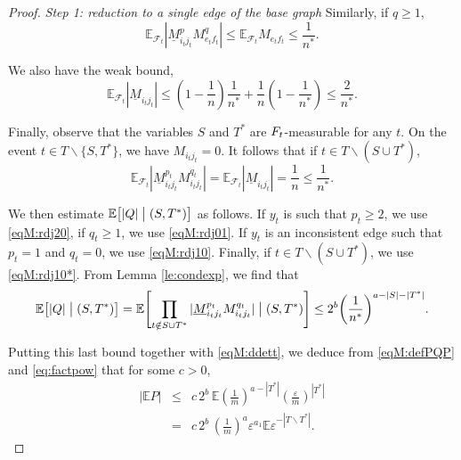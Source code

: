 \documentclass[11pt]{article}
\newcommand{\dE}{\mathbb {E}}
\newcommand{\cF}{\mathcal {F}}
\newcommand{\ABS}[1]{{{\left| #1 \right|}}} %
\newcommand{\SBRA}[1]{{{\left[#1\right]}}} %
\newcommand{\PAR}[1]{{{\left(#1\right)}}} %
\newcommand{\1}{1\!\!{\sf I}}\newcommand{\IND}{\1}
\newcommand{\veps}{\varepsilon}
\begin{document}
\begin{proof}  {\em Step 1: reduction to a single edge of the base graph}
Similarly, if $q \geq 1$, 
\begin{equation} \label{eqM:rdj01}
\dE_{\cF_t}  | \underline M_{i_t j_t}^p M_{e_t f_t}^q |  \leq \dE_{\cF_t}   M_{e_t f_t}    \leq \frac{1}{n^*}. 
\end{equation}

We also have the weak bound,
\begin{equation} \label{eqM:rdj10}
\dE_{\cF_t} |   \underline M_{i_t j_t} |    \leq \PAR{ 1 - \frac 1 n }  \frac{ 1} {n^*}  + \frac{1}{n}   \PAR{ 1 -  \frac{ 1} { n^*} } \leq \frac{2}{n^*}. 
\end{equation}

Finally, observe that the variables $S$ and $T^*$ are $\mathcal \cF_t$-measurable for any $t$. On the event $t \in T \backslash \{ S, T^*\}$, we have $M_{i_t j_t}  = 0$. It follows that if $t   \in T \backslash ( S \cup T^*)$, 
\begin{equation} \label{eqM:rdj10*}
\dE_{\cF_t} |   \underline M^{p_t}_{i_t j_t} M_{i_t j_t}^{q_t}|    =\dE_{\cF_t} |   \underline M_{i_t j_t} | = \frac 1 n  \leq \frac{1}{n^*}. 
\end{equation}


We then estimate $\dE \SBRA{  | Q |  \bigm| (S,T^*) }$ as follows. If $y_t$ is such that $p_t \geq 2$, we use \eqref{eqM:rdj20},  if  $q_t \geq 1$, we use \eqref{eqM:rdj01}. If $y_t$ is an inconsistent edge such that $p_t = 1$ and $q_t = 0$, we use \eqref{eqM:rdj10}. Finally, if $t \in T \backslash ( S \cup T^*)$,  we use \eqref{eqM:rdj10*}. From Lemma \ref{le:condexp}, we find that
$$
\dE \SBRA{  | Q |  \bigm| (S,T^*) } =  \dE \SBRA{ \prod_{t\notin  S \cup T^* }   | \underline M_{i_tj_t} ^{p_t}  M_{i_t j_t} ^{q_t}| \bigm| (S,T^*) } \leq 2^b \PAR{\frac{1}{n^*} }^{a - |S| - |T^*|}.
$$

Putting this last bound together with \eqref{eqM:ddett}, we deduce from \eqref{eqM:defPQP} and \eqref{eq:factpow}  that for some $c >0$, 
\begin{eqnarray*}
\ABS{ \dE P   } &\leq &  c \, 2^b \, \dE \PAR{  \frac {1} m }^{a - |T^*| }   \PAR{ \frac{\veps  }{ m} }^{|T^*|}   \\
& = & c  \, 2^b \, \PAR{\frac{1}{m}}^{a} \veps^{a_1} \dE \veps^{-|T \backslash T^*|}.
\end{eqnarray*}


\end{proof}
\end{document}
